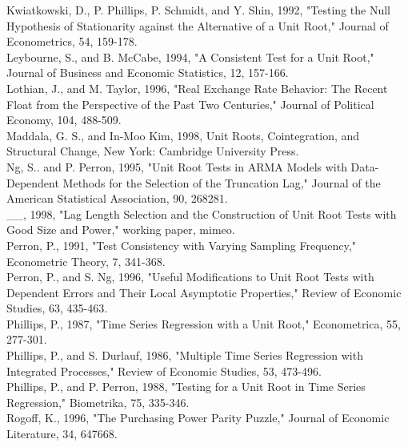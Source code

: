 \documentclass[10pt]{article}
\begin{document}
Kwiatkowski, D., P. Phillips, P. Schmidt, and Y. Shin, 1992, "Testing the Null Hypothesis of Stationarity against the Alternative of a Unit Root," Journal of Econometrics, 54, 159-178.\\
Leybourne, S., and B. McCabe, 1994, "A Consistent Test for a Unit Root," Journal of Business and Economic Statistics, 12, 157-166.\\
Lothian, J., and M. Taylor, 1996, "Real Exchange Rate Behavior: The Recent Float from the Perspective of the Past Two Centuries," Journal of Political Economy, 104, 488-509.\\
Maddala, G. S., and In-Moo Kim, 1998, Unit Roots, Cointegration, and Structural Change, New York: Cambridge University Press.\\
Ng, S.. and P. Perron, 1995, "Unit Root Tests in ARMA Models with Data-Dependent Methods for the Selection of the Truncation Lag," Journal of the American Statistical Association, 90, 268281.\\
\_\_, 1998, "Lag Length Selection and the Construction of Unit Root Tests with Good Size and Power," working paper, mimeo.\\
Perron, P., 1991, "Test Consistency with Varying Sampling Frequency," Econometric Theory, 7, 341-368.\\
Perron, P., and S. Ng, 1996, "Useful Modifications to Unit Root Tests with Dependent Errors and Their Local Asymptotic Properties," Review of Economic Studies, 63, 435-463.\\
Phillips, P., 1987, "Time Series Regression with a Unit Root," Econometrica, 55, 277-301.\\
Phillips, P., and S. Durlauf, 1986, "Multiple Time Series Regression with Integrated Processes," Review of Economic Studies, 53, 473-496.\\
Phillips, P., and P. Perron, 1988, "Testing for a Unit Root in Time Series Regression," Biometrika, 75, 335-346.\\
Rogoff, K., 1996, "The Purchasing Power Parity Puzzle," Journal of Economic Literature, 34, 647668.
\end{document}

